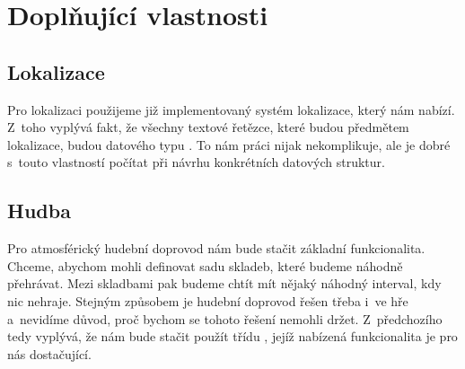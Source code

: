 
\section{Doplňující vlastnosti}



\subsection{Lokalizace}

Pro lokalizaci použijeme již implementovaný systém lokalizace, který nám \UE{} nabízí. Z~toho vyplývá fakt, že všechny textové řetězce, které budou předmětem lokalizace, budou datového typu . To nám práci nijak nekomplikuje, ale je dobré s~touto vlastností počítat při návrhu konkrétních datových struktur.

\subsection{Hudba}

Pro atmosférický hudební doprovod nám bude stačit základní funkcionalita. Chceme, abychom mohli definovat sadu skladeb, které budeme náhodně přehrávat. Mezi skladbami pak budeme chtít mít nějaký náhodný interval, kdy nic nehraje. Stejným způsobem je hudební doprovod řešen třeba i~ve hře \MC{} a~nevidíme důvod, proč bychom se tohoto řešení nemohli držet. Z~předchozího tedy vyplývá, že nám bude stačit použít třídu , jejíž nabízená funkcionalita je pro nás dostačující.
